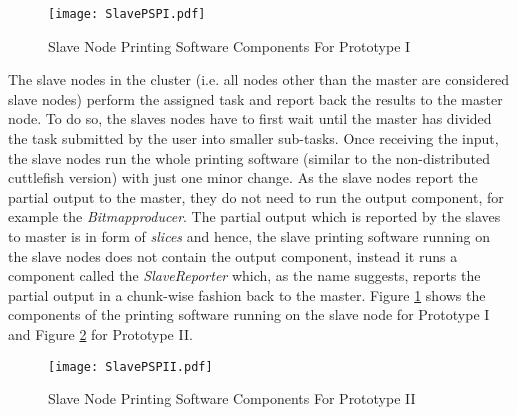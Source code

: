 \begin{figure}[b]
\centering
\texttt{[image: SlavePSPI.pdf]}
\caption{Slave Node Printing Software Components For Prototype I }
\label{fig:SlavePS}
\end{figure}

The slave nodes in the cluster (i.e. all nodes other than the master are considered slave nodes) perform the assigned task and report back the results to the master node. To do so, the slaves nodes have to first wait until the master has divided the task submitted by the user into smaller sub-tasks. Once receiving the input, the slave nodes run the whole printing software (similar to the non-distributed cuttlefish version) with just one minor change. As the slave nodes report the partial output to the master, they do not need to run the output component, for example the \textit{Bitmapproducer}. The partial output which is reported by the slaves to master is in form of \textit{slices} and hence, the slave printing software running on the slave nodes does not contain the output component, instead it runs a component called the \textit{SlaveReporter} which, as the name suggests, reports the partial output in a chunk-wise fashion back to the master. Figure \ref{fig:SlavePS} shows the components of the printing software running on the slave node for Prototype I and Figure \ref{fig:SlavePSII} for Prototype II.

\begin{figure}[t]
\centering
\texttt{[image: SlavePSPII.pdf]}
\caption{Slave Node Printing Software Components For Prototype II }
\label{fig:SlavePSII}
\end{figure}

\clearpage
